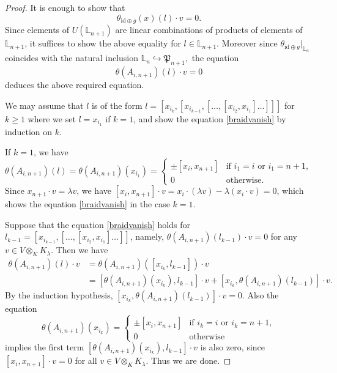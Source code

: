 \documentclass[10pt,a4paper]{amsart}
\begin{document}
\begin{proof}
	It is enough to show that 
	\[
		\theta_{\mathrm{id}\oplus g}(x)(l)\cdot v=0.
	\]
Since elements of $U(\mathbb{L}_{n+1})$ are linear combinations of 
products 
of elements of $\mathbb{L}_{n+1}$,
it suffices to show the above equality for 
$l\in \mathbb{L}_{n+1}$.
Moreover since $\theta_{\mathrm{id}\oplus g}|_{\mathbb{L}_{n}}$ coincides with the natural inclusion 
$
\mathbb{L}_{n}\hookrightarrow\mathfrak{P}_{n+1},
$
the equation 
\begin{equation}\label{braidvanish}
	\theta(A_{i,n+1})(l)\cdot v=0
\end{equation}
deduces the above required equation. 

We may assume that 
$l$ is of the form 
$l=[x_{i_{k}},[x_{i_{k-1}},[\ldots,[x_{i_2},x_{i_1}]\ldots]]]$
for $k\ge 1$ where we set $l=x_{i_1}$ if $k=1$,
and show the equation \eqref{braidvanish}
by induction on $k$. 

If $k=1$, we have
\[
\theta(A_{i,n+1})(l)=\theta(A_{i,n+1})(x_{i_1})=
\begin{cases}
\pm [x_{i},x_{n+1}] & \text{if $i_{1}=i$ or $i_{1}=n+1$},\\
0 & \text{otherwise}.
\end{cases}
\]
Since $x_{n+1}\cdot v=\lambda v$, 
we have $[x_{i},x_{n+1}]\cdot v=x_{i}\cdot (\lambda v)-\lambda (x_{i}\cdot v)=0$,
which shows the equation \eqref{braidvanish} in the case $k=1$.

Suppose that the equation \eqref{braidvanish}
holds for $l_{k-1}=[x_{i_{k-1}},[\ldots,[x_{i_2},x_{i_1}]\ldots]]$,
namely, $\theta(A_{i,n+1})(l_{k-1})\cdot v=0$
for any $v\in V\otimes_{K}K_{\lambda}$.
Then we have
\begin{align*}
\theta(A_{i,n+1})(l)\cdot v&=\theta(A_{i,n+1})([x_{i_{k}},l_{k-1}])\cdot v\\
&=
[\theta(A_{i,n+1})(x_{i_{k}}),l_{k-1}]\cdot v
+ [x_{i_{k}},\theta(A_{i,n+1})(l_{k-1})]\cdot v.
\end{align*}
By the induction hypothesis,
$[x_{i_{k}},\theta(A_{i,n+1})(l_{k-1})]\cdot v=0$.
Also the equation 
\[
\theta(A_{i,n+1})(x_{i_k})=
\begin{cases}
\pm [x_{i},x_{n+1}] & \text{if $i_{k}=i$ or $i_{k}=n+1$},\\
0 & \text{otherwise}
\end{cases}
\]
implies 
the first term $[\theta(A_{i,n+1})(x_{i_{k}}),l_{k-1}]\cdot v$ is also zero, 
since $[x_{i},x_{n+1}]\cdot v=0$ for all $v\in V\otimes_{K}K_{\lambda}$.
Thus we are done.
\end{proof}
\end{document}
